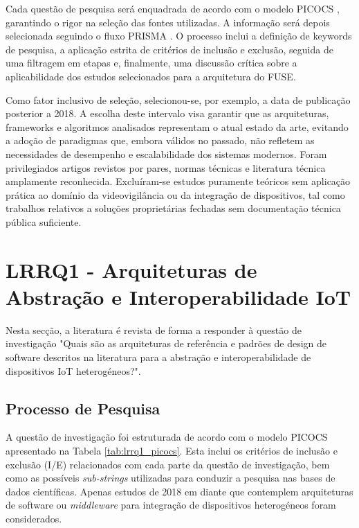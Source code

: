 Cada questão de pesquisa será enquadrada de acordo com o modelo \gls{PICOCS} \cite{Alberto2015}, garantindo o rigor na seleção das fontes utilizadas. A informação será depois selecionada seguindo o fluxo \gls{PRISMA} \cite{Moher2010}. O processo inclui a definição de keywords de pesquisa, a aplicação estrita de critérios de inclusão e exclusão, seguida de uma filtragem em etapas e, finalmente, uma discussão crítica sobre a aplicabilidade dos estudos selecionados para a arquitetura do \gls{FUSE}.

Como fator inclusivo de seleção, selecionou-se, por exemplo, a data de publicação posterior a 2018. A escolha deste intervalo visa garantir que as arquiteturas, frameworks e algoritmos analisados representam o atual estado da arte, evitando a adoção de paradigmas que, embora válidos no passado, não refletem as necessidades de desempenho e escalabilidade dos sistemas modernos. Foram privilegiados artigos revistos por pares, normas técnicas e literatura técnica amplamente reconhecida. Excluíram-se estudos puramente teóricos sem aplicação prática ao domínio da videovigilância ou da integração de dispositivos, tal como trabalhos relativos a soluções proprietárias fechadas sem documentação técnica pública suficiente.


\section{LRRQ1 - Arquiteturas de Abstração e Interoperabilidade IoT}
\label{sec:lrrq1_iot}

Nesta secção, a literatura é revista de forma a responder à questão de investigação "Quais são as arquiteturas de referência e padrões de design de software descritos na literatura para a abstração e interoperabilidade de dispositivos IoT heterogéneos?".

\subsection{Processo de Pesquisa}

A questão de investigação foi estruturada de acordo com o modelo PICOCS apresentado na Tabela \ref{tab:lrrq1_picocs}.
Esta inclui os critérios de inclusão e exclusão (I/E) relacionados com cada parte da questão de investigação, bem como as possíveis \textit{sub-strings} utilizadas para conduzir a pesquisa nas bases de dados científicas. Apenas estudos de 2018 em diante que contemplem arquiteturas de software ou \textit{middleware} para integração de dispositivos heterogéneos foram considerados.

